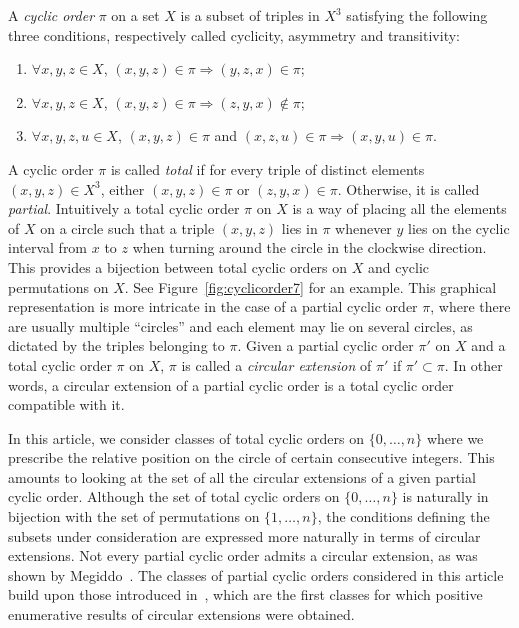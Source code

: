 \documentclass[11pt]{article}
\theoremstyle{definition}
\numberwithin{equation}{section}
\numberwithin{figure}{section}
\numberwithin{table}{section}
\let\oldforall\forall
\renewcommand*{\forall}{\mathrel{\oldforall}}
\begin{document}
A \emph{cyclic order} $\pi$ on a set $X$ is a subset of triples in $X^3$ satisfying the following three conditions, respectively called cyclicity, asymmetry and transitivity:
\begin{enumerate}
\item $\forall x, y, z \in X$, $(x,y,z) \in \pi \Rightarrow (y,z,x) \in \pi$;\label{liste1.1}
\item $\forall x,y,z \in X$, $(x,y,z) \in \pi \Rightarrow (z,y,x) \not \in \pi$;\label{liste1.2}
\item $\forall x,y,z,u \in X$, $(x,y,z) \in \pi$ and $(x,z,u) \in \pi \Rightarrow (x,y,u) \in \pi$.\label{liste1.3}
\end{enumerate}
A cyclic order $\pi$ is called \emph{total} if for every triple of distinct elements $(x,y,z) \in X^3$, either $(x,y,z)\in \pi$ or $(z,y,x) \in \pi$. Otherwise, it is called \emph{partial}. Intuitively a total cyclic order $\pi$ on $X$ is a way of placing all the elements of $X$ on a circle such that a triple $(x,y,z)$ lies in $\pi$ whenever $y$ lies on the cyclic interval from $x$ to $z$ when turning around the circle in the clockwise direction. This provides a bijection between total cyclic orders on $X$ and cyclic permutations on $X$. See Figure~\ref{fig:cyclicorder7} for an example. This graphical representation is more intricate in the case of a partial cyclic order $\pi$, where there are usually multiple ``circles'' and each element may lie on several circles, as dictated by the triples belonging to $\pi$. Given a partial cyclic order $\pi'$ on $X$ and a total cyclic order $\pi$ on $X$, $\pi$ is called a \emph{circular extension} of $\pi'$ if $\pi' \subset \pi$. In other words, a circular extension of a partial cyclic order is a total cyclic order compatible with it.

In this article, we consider classes of total cyclic orders on $\{0,\ldots,n\}$ where we prescribe the relative position on the circle of certain consecutive integers. This amounts to looking at the set of all the circular extensions of a given partial cyclic order. Although the set of total cyclic orders on $\{0,\ldots,n\}$ is naturally in bijection with the set of permutations on $\{1,\ldots,n\}$, the conditions defining the subsets under consideration are expressed more naturally in terms of circular extensions. Not every partial cyclic order admits a circular extension, as was shown by Megiddo~\cite{M76}. The classes of partial cyclic orders considered in this article build upon those introduced in~\cite{R17}, which are the first classes for which positive enumerative results of circular extensions were obtained.
\end{document}
